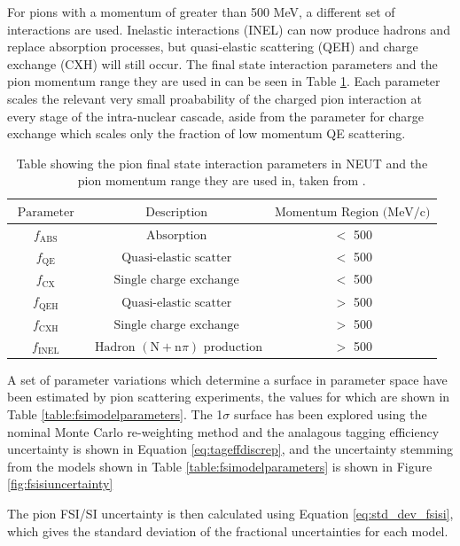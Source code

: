 For pions with a momentum of greater than 500 MeV, a different set of interactions are used. Inelastic interactions (INEL) can now produce hadrons and replace absorption processes, but quasi-elastic scattering (QEH) and charge exchange (CXH) will still occur. The final state interaction parameters and the pion momentum range they are used in can be seen in Table \ref{table:fsiparameters}. Each parameter scales the relevant very small proabability of the charged pion interaction at every stage of the intra-nuclear cascade, aside from the parameter for charge exchange which scales only the fraction of low momentum QE scattering. 


\begin{table}
\centering
\begin{tabular}{||ccc||}
\hline
$\text { Parameter }$ & $\text { Description }$ & $\text{Momentum Region (MeV/c)}$\\
\hline
$f_{\text{ABS}}$ & $\text{Absorption}$ & $<$ 500 \\
$f_{\text{QE}}$ & $\text { Quasi-elastic scatter }$ & $<$ 500 \\
$f_{\text{CX}}$ & $\text { Single charge exchange }$ & $<$ 500 \\
$f_{\text{QEH}}$ & $\text { Quasi-elastic scatter }$ & $>$ 500 \\
$f_{\text{CXH}}$ & $\text { Single charge exchange }$ & $>$ 500 \\
$f_{\text{INEL}}$ & $\text { Hadron }(\text{N}+\text{n}\pi)$ $\text {production}$ & $>$ 500 \\
\hline
\end{tabular}
\caption{Table showing the pion final state interaction parameters in NEUT and the pion momentum range they are used in, taken from \cite{tn_32}.}
\label{table:fsiparameters}
\end{table}



A set of parameter variations which determine a surface in parameter space have been estimated by pion scattering experiments, the values for which are shown in Table \ref{table:fsimodelparameters}. The 1$\sigma$ surface has been explored using the nominal Monte Carlo re-weighting method and the analagous tagging efficiency uncertainty is shown in Equation \ref{eq:tageffdiscrep}, and the uncertainty stemming from the models shown in Table \ref{table:fsimodelparameters} is shown in Figure \ref{fig:fsisiuncertainty}


The pion FSI/SI uncertainty is then calculated using Equation \ref{eq:std_dev_fsisi}, which gives the standard deviation of the fractional uncertainties for each model.


